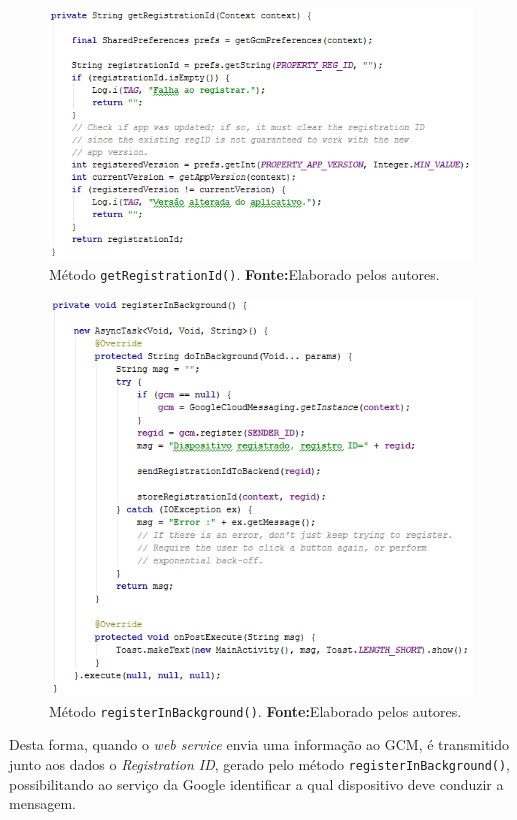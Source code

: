 		\begin{figure}[h!] 
			\centerline{\includegraphics[scale=0.7]{./imagens/2_q_metodologico/4_procedimentos_resultados/42_aplicativo/app17.png}}
			\caption[Método getRegistrationId()]{Método \texttt{getRegistrationId()}.
			\textbf{Fonte:}Elaborado pelos autores.}
			\label{fig:app17}
		\end{figure}
	
		\begin{figure}[h!] 
			\centerline{\includegraphics[scale=0.8]{./imagens/2_q_metodologico/4_procedimentos_resultados/42_aplicativo/app18.png}}
			\caption[Método registerInBackground()]{Método \texttt{registerInBackground()}.
			\textbf{Fonte:}Elaborado pelos autores.}
			\label{fig:app18}
		\end{figure}
	
	\par Desta forma, quando o \textit{web service} envia uma informação ao GCM, é
transmitido junto aos dados o \textit{Registration ID}, gerado pelo método
\texttt{registerInBackground()}, possibilitando ao serviço da Google identificar
a qual dispositivo deve conduzir a mensagem.
